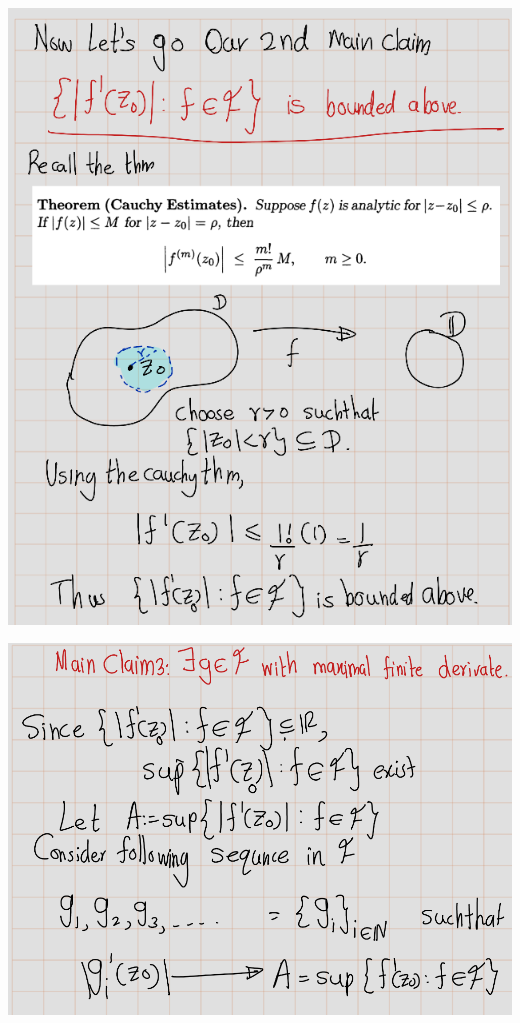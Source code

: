 \documentclass[
]{book}
\theoremstyle{definition}
\theoremstyle{definition}
\theoremstyle{definition}
\theoremstyle{definition}
\theoremstyle{remark}
\begin{document}
\begin{center}\includegraphics[width=8.76in]{figures/Riemann_Mapping_Therom/fig11} \end{center}

\begin{center}\includegraphics[width=13.85in]{figures/Riemann_Mapping_Therom/fig12} \end{center}
\end{document}
